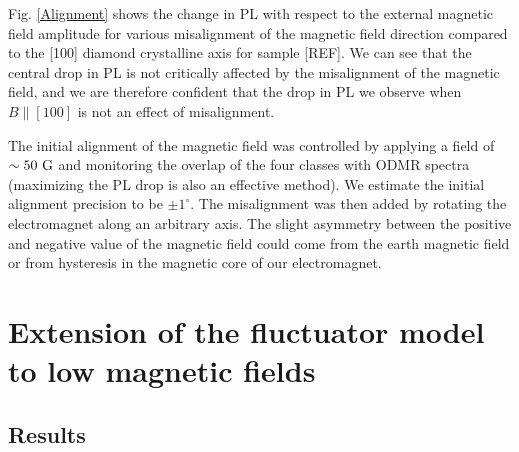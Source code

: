 \documentclass[preprintnumbers,amsmath,amssymb,onecolumn,12pt]{revtex4-2}\usepackage{graphicx}%
\begin{document}
Fig. \ref{Alignment} shows the change in PL with respect to the external magnetic field amplitude for various misalignment of the magnetic field direction compared to the [100] diamond crystalline axis for sample [REF]. We can see that the central drop in PL is not critically affected by the misalignment of the magnetic field, and we are therefore confident that the drop in PL we observe when $B\parallel [100]$ is not an effect of misalignment.

The initial alignment of the magnetic field was controlled by applying a field of $\sim 50\ \rm G$ and monitoring the overlap of the four classes with ODMR spectra (maximizing the PL drop is also an effective method). We estimate the initial alignment precision to be $\pm 1^\circ$. The misalignment was then added by rotating the electromagnet along an arbitrary axis. The slight asymmetry between the positive and negative value of the magnetic field could come from the earth magnetic field or from hysteresis in the magnetic core of our electromagnet.
\section{Extension of the fluctuator model to low magnetic fields}

\subsection{Results}
\end{document}
